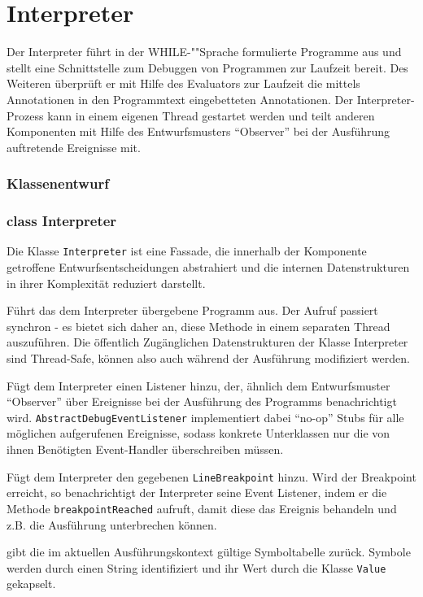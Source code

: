 \section{Interpreter}

Der Interpreter führt in der WHILE-""Sprache formulierte Programme aus und stellt eine Schnittstelle zum Debuggen von Programmen zur Laufzeit bereit. Des Weiteren überprüft er mit Hilfe des Evaluators zur Laufzeit die mittels Annotationen in den Programmtext eingebetteten Annotationen. Der Interpreter-Prozess kann in einem eigenen Thread gestartet werden und teilt anderen Komponenten mit Hilfe des Entwurfsmusters ``Observer'' bei der Ausführung auftretende Ereignisse mit.

\subsubsection{Klassenentwurf}

\subsubsection{class Interpreter}
Die Klasse \texttt{Interpreter} ist eine Fassade, die innerhalb der Komponente getroffene Entwurfsentscheidungen abstrahiert und die internen Datenstrukturen in ihrer Komplexität reduziert darstellt.

\begin{description}

    Führt das dem Interpreter übergebene Programm aus. Der Aufruf passiert synchron - es bietet sich daher an, diese Methode in einem separaten Thread auszuführen. Die öffentlich Zugänglichen Datenstrukturen der Klasse Interpreter sind Thread-Safe, können also auch während der Ausführung modifiziert werden.

    Fügt dem Interpreter einen Listener hinzu, der, ähnlich dem Entwurfsmuster ``Observer'' über Ereignisse bei der Ausführung des Programms benachrichtigt wird. \texttt{AbstractDebugEventListener} implementiert dabei ``no-op'' Stubs für alle möglichen aufgerufenen Ereignisse, sodass konkrete Unterklassen nur die von ihnen Benötigten Event-Handler überschreiben müssen.


    Fügt dem Interpreter den gegebenen \texttt{LineBreakpoint} hinzu. Wird der Breakpoint erreicht, so benachrichtigt der Interpreter seine Event Listener, indem er die Methode \texttt{breakpointReached} aufruft, damit diese das Ereignis behandeln und z.B. die Ausführung unterbrechen können.

     gibt die im aktuellen Ausführungskontext gültige Symboltabelle zurück. Symbole werden durch einen String identifiziert und ihr Wert durch die Klasse \texttt{Value} gekapselt.
\end{description}

